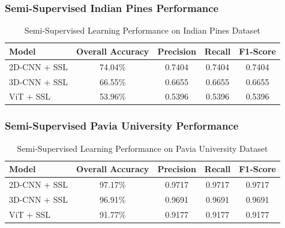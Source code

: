 \subsubsection{Semi-Supervised Indian Pines Performance}
\begin{table}[H]
    \centering
    \caption{Semi-Supervised Learning Performance on Indian Pines Dataset}
    \label{tab:ssl_indian}
    \renewcommand{\arraystretch}{1.2}
    \begin{tabular}{|l|c|c|c|c|}
        \hline
        \textbf{Model} & \textbf{Overall Accuracy} & \textbf{Precision} & \textbf{Recall} & \textbf{F1-Score} \\ \hline
        2D-CNN + SSL & 74.04\% & 0.7404 & 0.7404 & 0.7404 \\ \hline
        3D-CNN + SSL & 66.55\% & 0.6655 & 0.6655 & 0.6655 \\ \hline
        ViT + SSL & 53.96\% & 0.5396 & 0.5396 & 0.5396 \\ \hline
    \end{tabular}
\end{table}

\subsubsection{Semi-Supervised Pavia University Performance}
\begin{table}[H]
    \centering
    \caption{Semi-Supervised Learning Performance on Pavia University Dataset}
    \label{tab:ssl_pavia}
    \renewcommand{\arraystretch}{1.2}
    \begin{tabular}{|l|c|c|c|c|}
        \hline
        \textbf{Model} & \textbf{Overall Accuracy} & \textbf{Precision} & \textbf{Recall} & \textbf{F1-Score} \\ \hline
        2D-CNN + SSL & 97.17\% & 0.9717 & 0.9717 & 0.9717 \\ \hline
        3D-CNN + SSL & 96.91\% & 0.9691 & 0.9691 & 0.9691 \\ \hline
        ViT + SSL & 91.77\% & 0.9177 & 0.9177 & 0.9177 \\ \hline
    \end{tabular}
\end{table}


